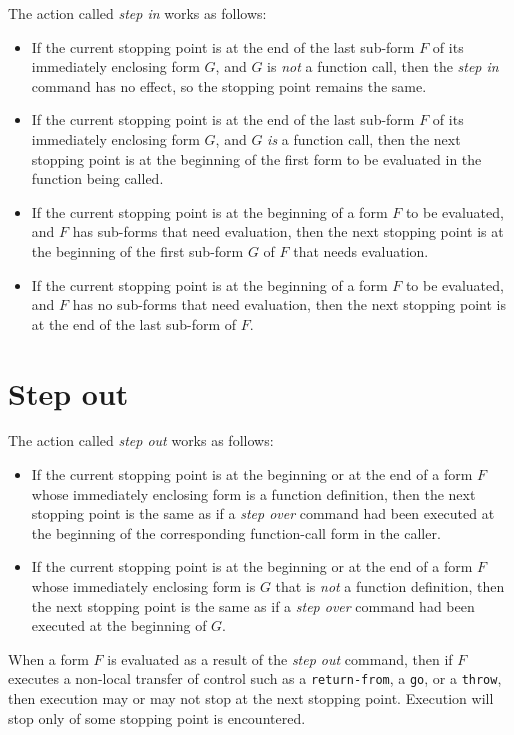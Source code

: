 The action called \emph{step in} works as follows:

\begin{itemize}
\item If the current stopping point is at the end of the last sub-form
  $F$ of its immediately enclosing form $G$, and $G$ is \emph{not} a
  function call, then the \emph{step in} command has no effect, so the
  stopping point remains the same.
\item If the current stopping point is at the end of the last sub-form
  $F$ of its immediately enclosing form $G$, and $G$ \emph{is} a
  function call, then the next stopping point is at the beginning of
  the first form to be evaluated in the function being called.
\item If the current stopping point is at the beginning of a form $F$
  to be evaluated, and $F$ has sub-forms that need evaluation, then
  the next stopping point is at the beginning of the first sub-form
  $G$ of $F$ that needs evaluation.
\item If the current stopping point is at the beginning of a form $F$
  to be evaluated, and $F$ has no sub-forms that need evaluation, then
  the next stopping point is at the end of the last sub-form of $F$.
\end{itemize}

\section{Step out}

The action called \emph{step out} works as follows:

\begin{itemize}
\item If the current stopping point is at the beginning or at the end
  of a form $F$ whose immediately enclosing form is a function
  definition, then the next stopping point is the same as if a
  \emph{step over} command had been executed at the beginning of the
  corresponding function-call form in the caller.
\item If the current stopping point is at the beginning or at the end
  of a form $F$ whose immediately enclosing form is $G$ that is
  \emph{not} a function definition, then the next stopping point is
  the same as if a \emph{step over} command had been executed at the
  beginning of $G$.
\end{itemize}

When a form $F$ is evaluated as a result of the \emph{step out}
command, then if $F$ executes a non-local transfer of control such as
a \texttt{return-from}, a \texttt{go}, or a \texttt{throw}, then
execution may or may not stop at the next stopping point.  Execution
will stop only of some stopping point is encountered.

